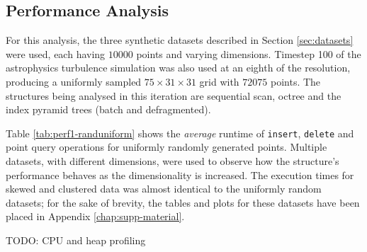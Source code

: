 \subsection{Performance Analysis}

For this analysis, the three synthetic datasets described in Section \ref{sec:datasets} were used, each having $10000$ points and varying dimensions. Timestep 100 of the astrophysics turbulence simulation was also used at an eighth of the resolution, producing a uniformly sampled $75 \times 31 \times 31$ grid with $72075$ points. The structures being analysed in this iteration are sequential scan, octree and the index pyramid trees (batch and defragmented).

Table \ref{tab:perf1-randuniform} shows the \textit{average} runtime of \texttt{insert}, \texttt{delete} and point query operations for uniformly randomly generated points. Multiple datasets, with different dimensions, were used to observe how the structure's performance behaves as the dimensionality is increased. The execution times for skewed and clustered data was almost identical to the uniformly random datasets; for the sake of brevity, the tables and plots for these datasets have been placed in Appendix \ref{chap:supp-material}.

TODO: CPU and heap profiling

